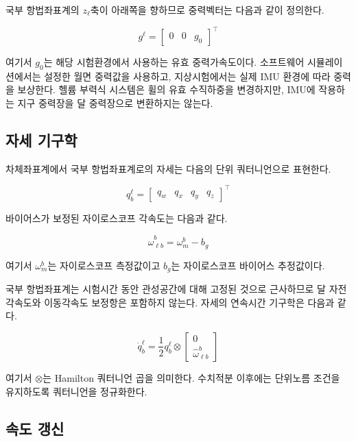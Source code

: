 \documentclass[]{IAC_style}
\begin{document}
국부 항법좌표계의 $z_\ell$축이 아래쪽을 향하므로 중력벡터는 다음과 같이 정의한다.

\begin{equation}
\tag{1}\label{eq:1}
g^\ell=\begin{bmatrix}0&0&g_0\end{bmatrix}^{\top}
\end{equation}

여기서 $g_0$는 해당 시험환경에서 사용하는 유효 중력가속도이다. 소프트웨어 시뮬레이션에서는 설정한 월면 중력값을 사용하고, 지상시험에서는 실제 IMU 환경에 따라 중력을 보상한다. 헬륨 부력식 시스템은 휠의 유효 수직하중을 변경하지만, IMU에 작용하는 지구 중력장을 달 중력장으로 변환하지는 않는다.

\subsection{자세 기구학}

차체좌표계에서 국부 항법좌표계로의 자세는 다음의 단위 쿼터니언으로 표현한다.

\begin{equation*}
q_b^\ell=\begin{bmatrix}q_w&q_x&q_y&q_z\end{bmatrix}^{\top}
\end{equation*}

바이어스가 보정된 자이로스코프 각속도는 다음과 같다.

\begin{equation}
\tag{2}\label{eq:2}
\hat{\omega}_{\ell b}^b=\omega_m^b-b_g
\end{equation}

여기서 $\omega_m^b$는 자이로스코프 측정값이고 $b_g$는 자이로스코프 바이어스 추정값이다.

국부 항법좌표계는 시험시간 동안 관성공간에 대해 고정된 것으로 근사하므로 달 자전각속도와 이동각속도 보정항은 포함하지 않는다. 자세의 연속시간 기구학은 다음과 같다.

\begin{equation}
\tag{3}\label{eq:3}
\dot q_b^\ell=\frac{1}{2}q_b^\ell\otimes\begin{bmatrix}0\\\hat{\omega}_{\ell b}^b\end{bmatrix}
\end{equation}

여기서 $\otimes$는 Hamilton 쿼터니언 곱을 의미한다. 수치적분 이후에는 단위노름 조건을 유지하도록 쿼터니언을 정규화한다.

\subsection{속도 갱신}
\end{document}
